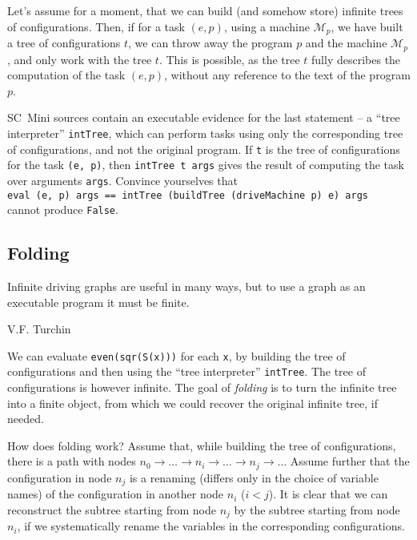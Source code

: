 Let's assume for a moment, that we can build (and somehow store) infinite trees of configurations.
Then, if for a task $(e, p)$, using a machine $\mathcal{M}_p$, we have built a tree of configurations $t$,
we can throw away the program $p$ and the machine $\mathcal{M}_p$, and only work with the tree $t$.
This is possible, as the tree $t$ fully describes the computation of the task $(e, p)$,
without any reference to the text of the program $p$.

\begin{exercise}
SC~Mini sources contain an executable evidence for the last statement --
a ``tree interpreter'' \texttt{intTree}, which can perform tasks using only the 
corresponding tree of configurations, and not the original program.
If \texttt{t} is the tree of configurations for the task \texttt{(e, p)}, 
then \texttt{intTree t args} gives the result of computing the task over arguments \texttt{args}. 
Convince yourselves that
\\  \texttt{eval (e, p) args == intTree (buildTree (driveMachine p) e) args}
\\  cannot produce \texttt{False}.
\end{exercise}


\subsection{Folding}
\epigraph{Infinite driving graphs are useful in many ways, but to use a graph as an executable program it must be finite.}
{V.F. Turchin \cite{Turchin1986ProgramTrans}}
We can evaluate \texttt{even(sqr(S(x)))} for each \texttt{x}, by building the tree of configurations
and then using the ``tree interpreter'' \texttt{intTree}. 
The tree of configurations is however infinite.
The goal of \emph{folding} is to turn the infinite tree into a finite object,
from which we could recover the original infinite tree, if needed.

How does folding work?
Assume that, while building the tree of configurations, there is a path with nodes
$n_0 \rightarrow \ldots \rightarrow n_i \rightarrow \ldots \rightarrow n_j
\rightarrow \ldots$
Assume further that the configuration in node $n_j$ is a renaming (differs only in the choice
of variable names) of the configuration in another node $n_i$ ($i < j$). 
It is clear that we can reconstruct the subtree starting from node $n_j$
by the subtree starting from node $n_i$, if
we systematically rename the variables in the corresponding configurations.


